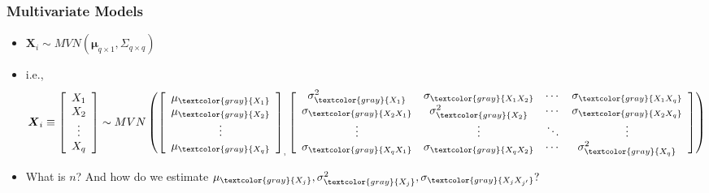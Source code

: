 \documentclass[xcolor={dvipsnames}]{beamer}
\begin{document}
\frame
{
 \frametitle{Multivariate Models}
\begin{itemize}
\item 
${\boldsymbol X}_i \sim MVN({\boldsymbol \mu}_{q\times1},\Sigma_{q \times q})$ 
\item[] i.e.,
$${\boldsymbol X}_i \equiv  \left[\begin{array}{c} X_1 \\ X_2 \\ \vdots\\ X_q \end{array} \right] \sim MVN\left(
 \left[\begin{array}{c} \mu_{\textcolor{gray}{X_1}} \\ \mu_{\textcolor{gray}{X_2}} \\ \vdots\\ \mu_{\textcolor{gray}{X_q}} \end{array} \right]_,
\left[\begin{array}{cccc}\sigma^2_{\textcolor{gray}{X_1}}&\sigma_{\textcolor{gray}{X_1X_2}} & \cdots & \sigma_{\textcolor{gray}{X_1X_q}}\\ 
\sigma_{\textcolor{gray}{X_2X_1}} &\sigma^2_{\textcolor{gray}{X_2}}&  \cdots & \sigma_{\textcolor{gray}{X_2X_q}}\\
\vdots &\vdots&  \ddots & \vdots\\
\sigma_{\textcolor{gray}{X_qX_1}} & \sigma_{\textcolor{gray}{X_qX_2}} &   \cdots & \sigma^2_{\textcolor{gray}{X_q}}\\ \end{array}\right]\right)$$
\item<2-> What is $n$? And how do we estimate $\mu_{\textcolor{gray}{X_j}}, \sigma^2_{\textcolor{gray}{X_j}}, \sigma_{\textcolor{gray}{X_jX_{j'}}}?$
\end{itemize}
}
\end{document}
